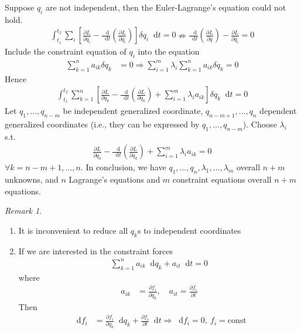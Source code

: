\documentclass[twoside,9pt]{article}
\numberwithin{equation}{section} %
\newcommand{\lms}{\fontfamily{lmss}\selectfont} %
\renewcommand*\d{\mathop{}\!\mathrm{d}}
\theoremstyle{definition}
\theoremstyle{remark}
\newtheorem*{remark}{\lms Remark}
\begin{document}
Suppose $q_i$ are not independent, then the Euler-Lagrange's equation
could not hold.
\begin{align*}
    \int_{t_1}^{t_2}\sum_i\left[
        \frac{\partial L}{\partial q_i}
        - \frac{\d}{\d t}\left(\frac{\partial L}{\partial\dot{q}_i}\right)
    \right]\delta q_i\d t = 0 
    \nRightarrow
    \frac{\d}{\d t}\left(\frac{\partial L}{\partial\dot{q}}\right)
    - \frac{\partial L}{\partial q_i} = 0
\end{align*}
Include the constraint equation of $q_i$ into the equation
\begin{align}
    \sum_{k=1}^n a_{ik}\delta q_k &= 0
    \Rightarrow
    \sum_{i=1}^m \lambda_i\sum_{k=1}^n a_{ik}\delta q_k = 0
\end{align}
Hence
\begin{align*}
    \int_{t_1}^{t_2}\sum_{k=1}^n\left[
        \frac{\partial L}{\partial q_k}
        - \frac{\d}{\d t}\left(\frac{\partial L}{\partial\dot{q}_k}\right)
        + \sum_{i=1}^m\lambda_i a_{ik}
    \right]\delta q_k\d t = 0 
\end{align*}
Let $q_1,\dots,q_{n-m}$ be independent generalized coordinate,
$q_{n-m+1},\dots,q_n$ dependent generalized coordinates (i.e., they can
be expressed by $q_1,\dots,q_{n-m}$).
Choose $\lambda_i$ s.t.
\begin{align}
    \frac{\partial L}{\partial q_k}
    - \frac{\d}{\d t}\left(\frac{\partial L}{\partial\dot{q}_k}\right)
    + \sum_{i=1}^m\lambda_i a_{ik}
    = 0
\end{align}
$\forall k = n-m+1,\dots,n$.
In conclusion, we have $q_1,\dots,q_n,\lambda_1,\dots,\lambda_m$ overall
$n+m$ unknowns, and $n$ Lagrange's equations and $m$ constraint equations
overall $n+m$ equations.
\begin{remark}\ 
\begin{enumerate}[label=\arabic*)]
\item It is inconvenient to reduce all $q_k$s to independent 
coordinates
\item If we are interested in the constraint forces
\begin{align*}
    \sum_{k=1}^n a_{ik}\d q_k + a_{it}\d t = 0
\end{align*}
where 
\begin{align*}
    a_{ik} &= \frac{\partial f_i}{\partial q_k},\quad
    a_{it} = \frac{\partial f_i}{\partial t}
\end{align*}
Then
\begin{align*}
    \d f_i &= \frac{\partial f_i}{\partial q_k}\d q_k + 
    \frac{\partial f_i}{\partial t}\d t
    \Rightarrow \d f_i = 0,~f_i=\text{const}
\end{align*}
\end{enumerate}
\end{remark}
\end{document}
